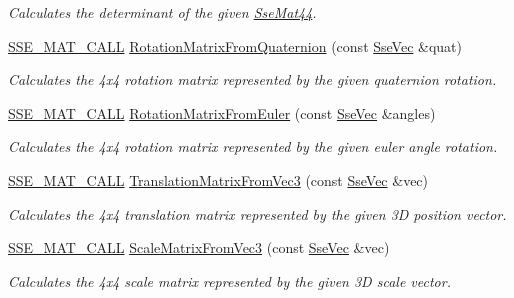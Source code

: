 \begin{DoxyCompactItemize}
\begin{DoxyCompactList}\small\item\em Calculates the determinant of the given \hyperlink{classgofxmath_1_1_sse_mat44}{Sse\+Mat44}. \end{DoxyCompactList}\item 
\hyperlink{ssemat__math__defs_8h_a741f88d5589197d03fea9ab2b7622b8a}{S\+S\+E\+\_\+\+M\+A\+T\+\_\+\+C\+A\+L\+L} \hyperlink{classgofxmath_1_1_sse_mat44_a786ee918eca59978387d6fce4dab5122}{Rotation\+Matrix\+From\+Quaternion} (const \hyperlink{namespacegofxmath_a634570ddcd2496053ee966227080e02f}{Sse\+Vec} \&quat)
\begin{DoxyCompactList}\small\item\em Calculates the 4x4 rotation matrix represented by the given quaternion rotation. \end{DoxyCompactList}\item 
\hyperlink{ssemat__math__defs_8h_a741f88d5589197d03fea9ab2b7622b8a}{S\+S\+E\+\_\+\+M\+A\+T\+\_\+\+C\+A\+L\+L} \hyperlink{classgofxmath_1_1_sse_mat44_ac11c40e17108aa72d069b01b6a08bebf}{Rotation\+Matrix\+From\+Euler} (const \hyperlink{namespacegofxmath_a634570ddcd2496053ee966227080e02f}{Sse\+Vec} \&angles)
\begin{DoxyCompactList}\small\item\em Calculates the 4x4 rotation matrix represented by the given euler angle rotation. \end{DoxyCompactList}\item 
\hyperlink{ssemat__math__defs_8h_a741f88d5589197d03fea9ab2b7622b8a}{S\+S\+E\+\_\+\+M\+A\+T\+\_\+\+C\+A\+L\+L} \hyperlink{classgofxmath_1_1_sse_mat44_a2b08e7c142f14df78883494d9c2f66e8}{Translation\+Matrix\+From\+Vec3} (const \hyperlink{namespacegofxmath_a634570ddcd2496053ee966227080e02f}{Sse\+Vec} \&vec)
\begin{DoxyCompactList}\small\item\em Calculates the 4x4 translation matrix represented by the given 3\+D position vector. \end{DoxyCompactList}\item 
\hyperlink{ssemat__math__defs_8h_a741f88d5589197d03fea9ab2b7622b8a}{S\+S\+E\+\_\+\+M\+A\+T\+\_\+\+C\+A\+L\+L} \hyperlink{classgofxmath_1_1_sse_mat44_a7971ccb3a66b526ba72c66477539c923}{Scale\+Matrix\+From\+Vec3} (const \hyperlink{namespacegofxmath_a634570ddcd2496053ee966227080e02f}{Sse\+Vec} \&vec)
\begin{DoxyCompactList}\small\item\em Calculates the 4x4 scale matrix represented by the given 3\+D scale vector. \end{DoxyCompactList}\item 

\end{DoxyCompactItemize}
